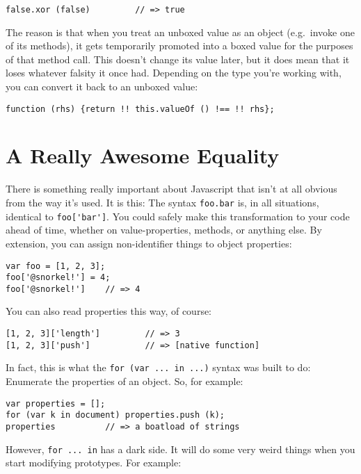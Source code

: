 \documentclass{article}
\begin{document}
\begin{verbatim}
false.xor (false)         // => true
\end{verbatim}

    The reason is that when you treat an unboxed value as an object (e.g.~invoke one of its methods), it gets temporarily promoted into a boxed value for the purposes of that method call.
    This doesn't change its value later, but it does mean that it loses whatever falsity it once had. Depending on the type you're working with, you can convert it back to an unboxed value:

\begin{verbatim}
function (rhs) {return !! this.valueOf () !== !! rhs};
\end{verbatim}

\section {A Really Awesome Equality}
  \label{sec:a-really-awesome-equality}
  There is something really important about Javascript that isn't at all obvious from the way it's used. It is this: The syntax \verb|foo.bar| is, in all situations, identical to
  \verb|foo['bar']|. You could safely make this transformation to your code ahead of time, whether on value-properties, methods, or anything else. By extension, you can assign non-identifier
  things to object properties:

\begin{verbatim}
var foo = [1, 2, 3];
foo['@snorkel!'] = 4;
foo['@snorkel!']    // => 4
\end{verbatim}

  You can also read properties this way, of course:

\begin{verbatim}
[1, 2, 3]['length']         // => 3
[1, 2, 3]['push']           // => [native function]
\end{verbatim}

  In fact, this is what the \verb|for (var ... in ...)| syntax was built to do: Enumerate the properties of an object. So, for example:

\begin{verbatim}
var properties = [];
for (var k in document) properties.push (k);
properties          // => a boatload of strings
\end{verbatim}

  However, \verb|for ... in| has a dark side. It will do some very weird things when you start modifying prototypes. For example:
\end{document}
